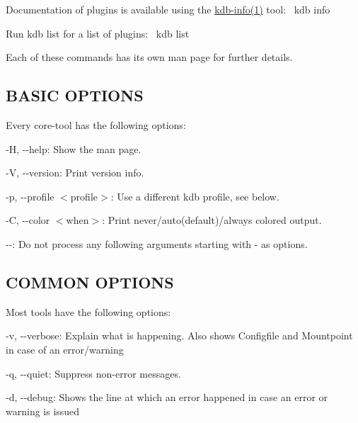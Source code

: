 Documentation of plugins is available using the \hyperlink{doc_help_kdb-info_md}{kdb-\/info(1)} tool\+:~\newline
 {\ttfamily kdb info}

Run {\ttfamily kdb list} for a list of plugins\+:~\newline
 {\ttfamily kdb list}

Each of these commands has its own man page for further details.

\subsection*{B\+A\+S\+IC O\+P\+T\+I\+O\+NS}

Every core-\/tool has the following options\+:


\begin{DoxyItemize}
\item {\ttfamily -\/H}, {\ttfamily -\/-\/help}\+: Show the man page.
\item {\ttfamily -\/V}, {\ttfamily -\/-\/version}\+: Print version info.
\item {\ttfamily -\/p}, {\ttfamily -\/-\/profile $<$profile$>$}\+: Use a different kdb profile, see below.
\item {\ttfamily -\/C}, {\ttfamily -\/-\/color $<$when$>$}\+: Print never/auto(default)/always colored output.
\item {\ttfamily -\/-\/}\+: Do not process any following arguments starting with {\ttfamily -\/} as options.
\end{DoxyItemize}

\subsection*{C\+O\+M\+M\+ON O\+P\+T\+I\+O\+NS}

Most tools have the following options\+:


\begin{DoxyItemize}
\item {\ttfamily -\/v}, {\ttfamily -\/-\/verbose}\+: Explain what is happening. Also shows Configfile and Mountpoint in case of an error/warning
\item {\ttfamily -\/q}, {\ttfamily -\/-\/quiet}\+: Suppress non-\/error messages.
\item {\ttfamily -\/d}, {\ttfamily -\/-\/debug}\+: Shows the line at which an error happened in case an error or warning is issued
\end{DoxyItemize}

